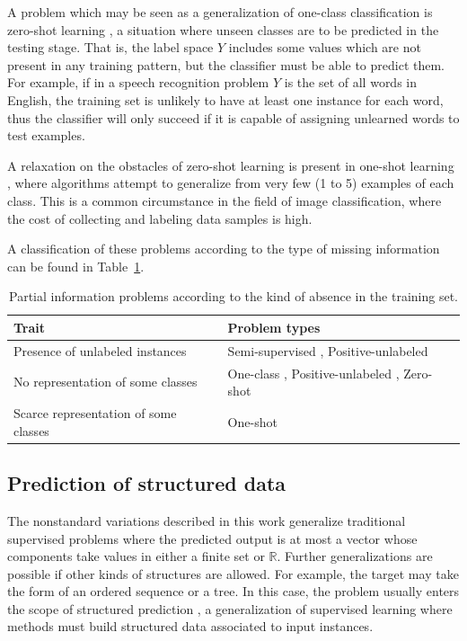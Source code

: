 \documentclass[
	fontsize=11pt, %
	twoside=false, %
	open=any, %
	secnumdepth=1, %
]{kaobook}
\begin{document}
A problem which may be seen as a generalization of one-class classification is zero-shot learning \cite{zeroshot}, a situation where unseen classes are to be predicted in the testing stage. That is, the label space $Y$ includes some values which are not present in any training pattern, but the classifier must be able to predict them. For example, if in a speech recognition problem $Y$ is the set of all words in English, the training set is unlikely to have at least one instance for each word, thus the classifier will only succeed if it is capable of assigning unlearned words to test examples.

A relaxation on the obstacles of zero-shot learning is present in one-shot learning \cite{oneshot}, where algorithms attempt to generalize from very few (1 to 5) examples of each class. This is a common circumstance in the field of image classification, where the cost of collecting and labeling data samples is high.

A classification of these problems according to the type of missing information can be found in Table~\ref{tbl.partial-problems}.

\begin{table}[ht]
\centering
\renewcommand{\arraystretch}{1.4}
\begin{tabular}{l  l}
\toprule
\textbf{Trait} & \textbf{Problem types} \\ \hline
Presence of unlabeled instances & Semi-supervised \cite{semi-sup}, Positive-unlabeled \cite{pu-learn} \\
No representation of some classes &   One-class \cite{oneclass}, Positive-unlabeled \cite{pu-learn}, Zero-shot \cite{zeroshot} \\
Scarce representation of some classes &  One-shot \cite{oneshot}\\
\toprule
\end{tabular}
\caption{\label{tbl.partial-problems}Partial information problems according to the kind of absence in the training set.}
\end{table}

\subsection{Prediction of structured data}

The nonstandard variations described in this work generalize traditional supervised problems where the predicted output is at most a vector whose components take values in either a finite set or $\mathbb R$. Further generalizations are possible if other kinds of structures are allowed. For example, the target may take the form of an ordered sequence or a tree. In this case, the problem usually enters the scope of structured prediction \cite{str-pred}, a generalization of supervised learning where methods must build structured data associated to input instances.
\end{document}
